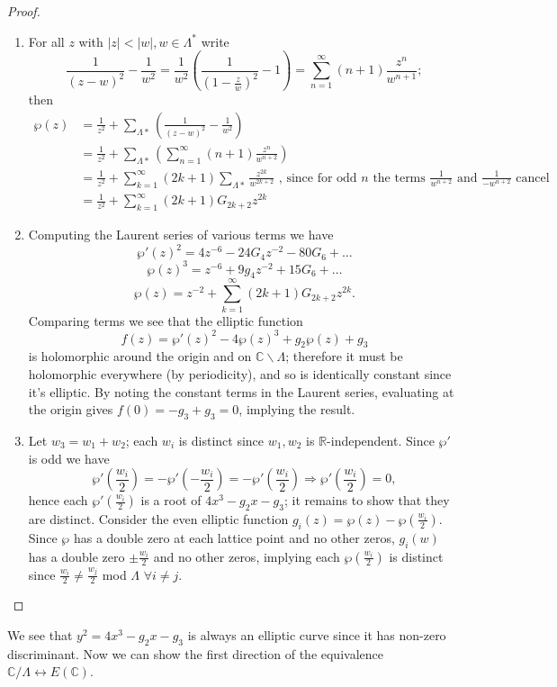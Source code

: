 \documentclass{article}
\theoremstyle{remark}
\begin{document}
\begin{proof}
\begin{enumerate}
\item For all $z$ with $|z|<|w|,w\in\Lambda^*$ write 
\[\frac{1}{(z-w)^2}-\frac{1}{w^2}=\frac{1}{w^2}\left(\frac{1}{(1-\frac{z}{w})^2}-1\right)=\sum_{n=1}^{\infty}(n+1)\frac{z^n}{w^{n+1}};  \] then
\begin{align*}
\wp(z)&=\frac{1}{z^2}+\sum_{\Lambda*}\left( \frac{1}{(z-w)^2}-\frac{1}{w^2}\right)\\
&=\frac{1}{z^2}+\sum_{\Lambda*}\left( \sum_{n=1}^{\infty}(n+1)\frac{z^n}{w^{n+2}}\right)\\
&=\frac{1}{z^2}+\sum_{k=1}^{\infty}(2k+1)\sum_{\Lambda*} \frac{z^{2k}}{w^{2k+2}}\text{ , since for odd $n$ the terms $\frac{1}{w^{n+2}}$ and $\frac{1}{-w^{n+2}}$ cancel}\\
&=\frac{1}{z^2}+\sum_{k=1}^{\infty}(2k+1)G_{2k+2}z^{2k}
\end{align*}
\item Computing the Laurent series of various terms we have
\[\wp'(z)^2=4z^{-6}-24G_4z^{-2}-80G_6+\ldots\]
\[\wp(z)^3=z^{-6}+9g_4z^{-2}+15G_6+\ldots\]
\[\wp(z)=z^{-2}+\sum_{k=1}^{\infty}(2k+1)G_{2k+2}z^{2k}.\]
Comparing terms we see that the elliptic function
\[f(z)=\wp'(z)^2-4\wp(z)^3+g_2\wp(z)+g_3\]
is holomorphic around the origin and on $\mathbb{C}\backslash\Lambda$; therefore it must be holomorphic everywhere (by periodicity), and so is identically constant since it's elliptic. By noting the constant terms in the Laurent series, evaluating at the origin gives $f(0)=-g_3+g_3=0$, implying the result.
\item Let $w_3=w_1+w_2$; each $w_i$ is distinct since $w_1,w_2$ is $\mathbb{R}$-independent. Since $\wp'$ is odd we have
\[\wp'\left(\frac{w_i}{2}\right)=-\wp'\left(-\frac{w_i}{2}\right)=-\wp'\left(\frac{w_i}{2}\right) \Longrightarrow \wp'\left(\frac{w_i}{2}\right)=0,\]
hence each $\wp'\left(\frac{w_i}{2}\right)$ is a root of $4x^3-g_2x-g_3$; it remains to show that they are distinct. Consider the even elliptic function $g_i(z)=\wp(z)-\wp\left(\frac{w_i}{2}\right)$. Since $\wp$ has a double zero at each lattice point and no other zeros, $g_i(w)$ has a double zero $\pm\frac{w_i}{2}$ and no other zeros, implying each $\wp\left(\frac{w_i}{2}\right)$ is distinct since $\frac{w_i}{2}\neq\frac{w_j}{2}$ mod $\Lambda$ $ \forall i\neq j$.


\end{enumerate}
\end{proof}
We see that $y^2=4x^3-g_2x-g_3$ is always an elliptic curve since it has non-zero discriminant. Now we can show the first direction of the equivalence $\mathbb{C}/\Lambda \leftrightarrow E(\mathbb{C})$.
\end{document}
